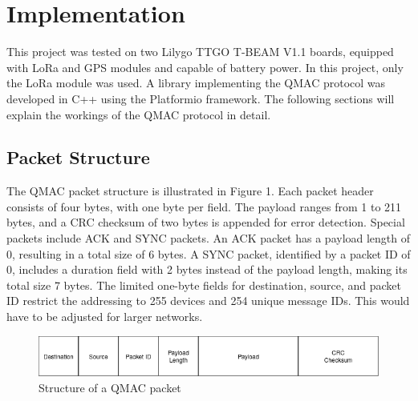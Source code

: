 \section*{Implementation}



This project was tested on two Lilygo TTGO T-BEAM V1.1 boards, equipped with LoRa and GPS modules and capable of battery power. In this project, only the LoRa module was used. A library implementing the QMAC protocol was developed in C++ using the Platformio framework. The following sections will explain the workings of the QMAC protocol in detail.


\subsection*{Packet Structure}

The QMAC packet structure is illustrated in Figure 1. Each packet header consists of four bytes, with one byte per field. The payload ranges from 1 to 211 bytes, and a CRC checksum of two bytes is appended for error detection. Special packets include ACK and SYNC packets. An ACK packet has a payload length of 0, resulting in a total size of 6 bytes. A SYNC packet, identified by a packet ID of 0, includes a duration field with 2 bytes instead of the payload length, making its total size 7 bytes. The limited one-byte fields for destination, source, and packet ID restrict the addressing to 255 devices and 254 unique message IDs. This would have to be adjusted for larger networks.


\begin{figure}[h]
	\centering
	\includegraphics[width=\textwidth]{figures/packet.png}
	\caption{Structure of a QMAC packet}
\end{figure}

